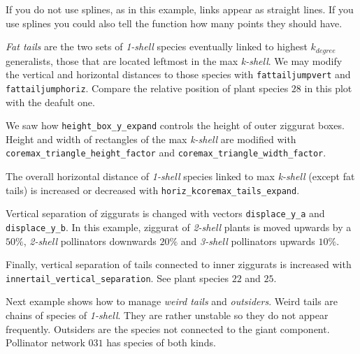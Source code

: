 \documentclass[12pt]{article}
\begin{document}
If you do not use splines, as in this example, links appear as straight lines. If you use splines you could also tell the function how many points they should have.

\textit{Fat tails} are the two sets of \textit{1-shell} species eventually linked to highest $k_{degree}$ generalists, those that are located
leftmost in the max \textit{k-shell}. We may modify the vertical and horizontal distances to those species with \texttt{fattailjumpvert}
and \texttt{fattailjumphoriz}. Compare the relative position of plant species $28$ in this plot with the deafult one.

We saw how \texttt{height\_box\_y\_expand} controls the height of outer ziggurat boxes. Height and width of rectangles of the max \textit{k-shell} are modified with \texttt{coremax\_triangle\_height\_factor} and \texttt{coremax\_triangle\_width\_factor}. 

The overall horizontal distance of \textit{1-shell} species linked to max \textit{k-shell} (except fat tails) is increased or decreased with
\texttt{horiz\_kcoremax\_tails\_expand}.

Vertical separation of ziggurats is changed with vectors \texttt{displace\_y\_a} and \texttt{displace\_y\_b}. In this example, ziggurat
of \textit{2-shell} plants is moved upwards by a $50\%$,  \textit{2-shell} pollinators downwards $20\%$ and  \textit{3-shell} pollinators upwards $10\%$.

Finally, vertical separation of tails connected to inner ziggurats is increased with \texttt{innertail\_vertical\_separation}. See plant
species $22$ and $25$.

Next example shows how to manage \textit{weird tails} and \textit{outsiders}. Weird tails are chains of species of \textit{1-shell}. They
are rather unstable so they do not appear frequently. Outsiders are the species not connected to the giant component. Pollinator network $031$
has species of both kinds.
\end{document}
